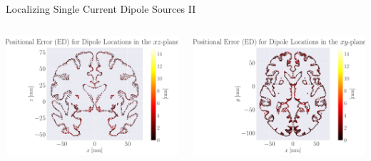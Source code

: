 \documentclass[aspectratio=169, 9pt]{beamer}
\begin{document}
\begin{frame}{Localizing Single Current Dipole Sources II}
  \begin{columns}
    \begin{column}{0.3\textwidth}
      \begin{itemize}
        \includegraphics[width=1.0\textwidth]{figures/MED_simple_dipole_error_Euclidean Distance_0.pdf}
      \end{itemize}
    \end{column}
    \begin{column}{0.3\textwidth}
      \begin{itemize}
        \includegraphics[width=1.0\textwidth]{figures/MED_simple_dipole_error_Euclidean Distance_1.pdf}
      \end{itemize}
    \end{column}

\end{columns}
\end{frame}
\end{document}
